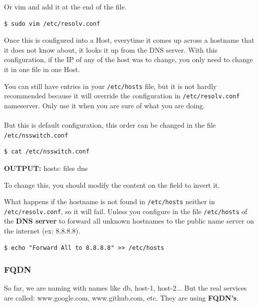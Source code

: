 \documentclass{article}
\newenvironment{blocktemplateIII}[1]{%
    \tcolorbox[beamer,%
    noparskip,breakable,
    ,colframe=Red,%
    colbacklower=LimeGreen!75!LightGreen,%
    title=#1]}%
    {\endtcolorbox}
\newenvironment{codetemplate}[1][]{%
  \mybasecolorbox[#1]
  \itshape
}{%
  \endmybasecolorbox
}
\begin{document}
Or vim and add it at the end of the file.
\begin{codetemplate}{}
\begin{verbatim}
$ sudo vim /etc/resolv.conf
\end{verbatim}
\end{codetemplate}

Once this is configured into a Host, everytime it comes up across a hostname that it does not know about, it looks it up from the DNS server. With this configuration, if the IP of any of the host was to change, you only need to change it in one file in one Host.

\begin{blocktemplateIII}{WARNING}
You can still have entries in your \verb|/etc/hosts| file, but it is not hardly recommended because it will override the configuration in \verb|/etc/resolv.conf| nameserver. Only use it when you are sure of what you are doing.
\\\\
But this is default configuration, this order can be changed in the file \verb|/etc/nsswitch.conf|
\begin{codetemplate}{}
\begin{verbatim}
$ cat /etc/nsswitch.conf
\end{verbatim}
\end{codetemplate}

\textbf{OUTPUT:} hosts:    files dns

To change this, you should modify the content on the field to invert it.
\end{blocktemplateIII}

What happens if the hostname is not found in \verb|/etc/hosts| neither in \verb|/etc/resolv.conf|, so it will fail. Unless you configure in the file \verb|/etc/hosts| of the \textbf{DNS server} to forward all unknown hostnames to the public name server on the internet (ex: 8.8.8.8).

\begin{codetemplate}{}
\begin{verbatim}
$ echo "Forward All to 8.8.8.8" >> /etc/hosts
\end{verbatim}
\end{codetemplate}

\subsubsection{FQDN}

So far, we are naming with names like db, host-1, host-2... But the real services are called: www.google.com, www.github.com, etc. They are using \textbf{FQDN's}.
\end{document}
